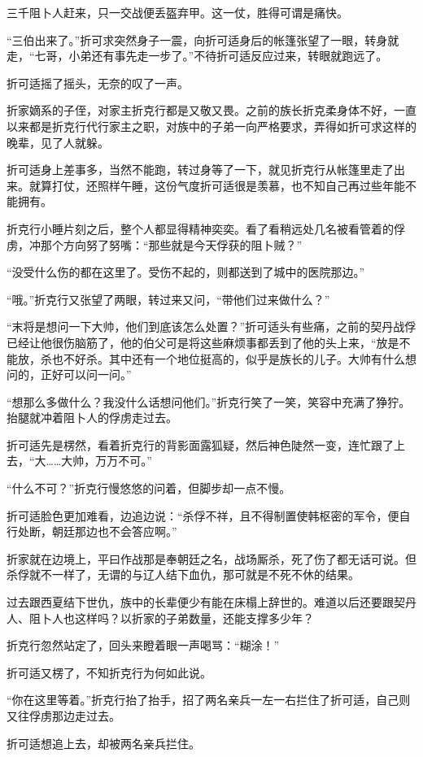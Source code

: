 三千阻卜人赶来，只一交战便丢盔弃甲。这一仗，胜得可谓是痛快。

“三伯出来了。”折可求突然身子一震，向折可适身后的帐篷张望了一眼，转身就走，“七哥，小弟还有事先走一步了。”不待折可适反应过来，转眼就跑远了。

折可适摇了摇头，无奈的叹了一声。

折家嫡系的子侄，对家主折克行都是又敬又畏。之前的族长折克柔身体不好，一直以来都是折克行代行家主之职，对族中的子弟一向严格要求，弄得如折可求这样的晚辈，见了人就躲。

折可适身上差事多，当然不能跑，转过身等了一下，就见折克行从帐篷里走了出来。就算打仗，还照样午睡，这份气度折可适很是羡慕，也不知自己再过些年能不能拥有。

折克行小睡片刻之后，整个人都显得精神奕奕。看了看稍远处几名被看管着的俘虏，冲那个方向努了努嘴：“那些就是今天俘获的阻卜贼？”

“没受什么伤的都在这里了。受伤不起的，则都送到了城中的医院那边。”

“哦。”折克行又张望了两眼，转过来又问，“带他们过来做什么？”

“末将是想问一下大帅，他们到底该怎么处置？”折可适头有些痛，之前的契丹战俘已经让他很伤脑筋了，他的伯父可是将这些麻烦事都丢到了他的头上来，“放是不能放，杀也不好杀。其中还有一个地位挺高的，似乎是族长的儿子。大帅有什么想问的，正好可以问一问。”

“想那么多做什么？我没什么话想问他们。”折克行笑了一笑，笑容中充满了狰狞。抬腿就冲着阻卜人的俘虏走过去。

折可适先是楞然，看着折克行的背影面露狐疑，然后神色陡然一变，连忙跟了上去，“大……大帅，万万不可。”

“什么不可？”折克行慢悠悠的问着，但脚步却一点不慢。

折可适脸色更加难看，边追边说：“杀俘不祥，且不得制置使韩枢密的军令，便自行处断，朝廷那边也不会答应啊。”


折家就在边境上，平曰作战那是奉朝廷之名，战场厮杀，死了伤了都无话可说。但杀俘就不一样了，无谓的与辽人结下血仇，那可就是不死不休的结果。

过去跟西夏结下世仇，族中的长辈便少有能在床榻上辞世的。难道以后还要跟契丹人、阻卜人也这样吗？以折家的子弟数量，还能支撑多少年？

折克行忽然站定了，回头来瞪着眼一声喝骂：“糊涂！”

折可适又楞了，不知折克行为何如此说。

“你在这里等着。”折克行抬了抬手，招了两名亲兵一左一右拦住了折可适，自己则又往俘虏那边走过去。

折可适想追上去，却被两名亲兵拦住。

